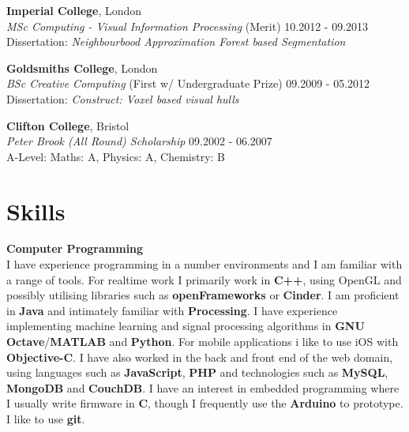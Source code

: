 \documentclass[margin,line,a4paper]{resume}
\begin{document}
\begin{resume}
\textbf{Imperial College}, London \vspace{0.5mm}\\
\textsl{MSc Computing - Visual Information Processing} (Merit) \hfill 10.2012 - 09.2013 \vspace{2mm} \\
Dissertation: \emph{Neighbourbood Approximation Forest based Segmentation}

\textbf{Goldsmiths College}, London \vspace{0.5mm}\\
\textsl{BSc Creative Computing} (First w/ Undergraduate Prize) \hfill 09.2009 - 05.2012 \vspace{2mm} \\
Dissertation: \emph{Construct: Voxel based visual hulls}

\textbf{Clifton College}, Bristol \vspace{0.5mm}\\
\textsl{Peter Brook (All Round) Scholarship} \hfill 09.2002 - 06.2007 \vspace{2mm} \\
A-Level: Maths: A, Physics: A, Chemistry: B \\

\newpage
\section{\mysidestyle Skills}

\textbf{Computer Programming} \vspace{1mm} \\
I have experience programming in a number environments and I am
familiar with a range of tools. For realtime work I primarily work in
\textbf{C++}, using OpenGL and possibly utilising
libraries such as \textbf{openFrameworks} or \textbf{Cinder}. I am
proficient in \textbf{Java} and intimately familiar with
\textbf{Processing}. I have experience implementing machine learning
and signal processing algorithms in \textbf{GNU
  Octave}/\textbf{MATLAB} and \textbf{Python}. For mobile applications
i like to use iOS with \textbf{Objective-C}. I have also worked in the
back and front end of the web domain, using languages such as
\textbf{JavaScript}, \textbf{PHP} and technologies such as
\textbf{MySQL}, \textbf{MongoDB} and \textbf{CouchDB}. I have an interest in embedded
programming where I usually write firmware in \textbf{C}, though I
frequently use the \textbf{Arduino} to prototype. I like to use
\textbf{git}.


\end{resume}
\end{document}
